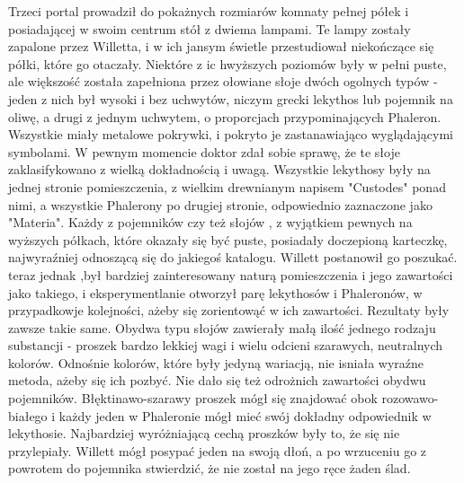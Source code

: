 Trzeci portal prowadził do pokażnych rozmiarów komnaty pełnej półek i posiadającej w swoim centrum stół z dwiema lampami. Te lampy zostały zapalone przez Willetta, i w ich jansym świetle przestudiował niekończące się półki, które go otaczały. Niektóre z ic hwyższych poziomów były w pełni puste, ale większość została zapełniona przez ołowiane słoje dwóch ogolnych typów - jeden z nich był wysoki i bez uchwytów, niczym grecki lekythos lub pojemnik na oliwę, a drugi z jednym uchwytem, o proporcjach przypominających Phaleron. Wszystkie miały metalowe pokrywki, i pokryto je zastanawiająco wyglądającymi symbolami. W pewnym momencie doktor zdał sobie sprawę, że te słoje zaklasifykowano z wielką dokładnością i uwagą. Wszystkie lekythosy były na jednej stronie pomieszczenia, z wielkim drewnianym napisem "Custodes" ponad nimi, a wszystkie Phalerony po drugiej stronie, odpowiednio zaznaczone jako "Materia". Każdy z pojemników czy też słojów , z wyjątkiem pewnych na wyższych półkach, które okazały się być puste, posiadały doczepioną karteczkę, najwyraźniej odnoszącą się do jakiegoś katalogu. Willett postanowił go poszukać. teraz jednak ,był bardziej zainteresowany naturą pomieszczenia i jego zawartości jako takiego, i eksperymentlanie otworzył parę lekythosów i Phaleronów, w przypadkowje kolejności, ażeby się zorientowąć w ich zawartości. Rezultaty były zawsze takie same. Obydwa typu słojów zawierały małą ilość jednego rodzaju substancji - proszek bardzo lekkiej wagi i wielu odcieni szarawych, neutralnych kolorów. Odnośnie kolorów, które były jedyną wariacją, nie isniała wyraźne metoda, ażeby się ich pozbyć. Nie dało się też odrożnich zawartości obydwu pojemników. Błęktinawo-szarawy proszek mógł się znajdować obok rozowawo-białego i każdy jeden w Phaleronie mógł mieć swój dokładny odpowiednik w lekythosie. Najbardziej wyróżniającą cechą proszków były to, że się nie przylepiały. Willett mógł posypać jeden na swoją dłoń, a po wrzuceniu go z powrotem do pojemnika stwierdzić, że nie został na jego ręce żaden ślad. 

